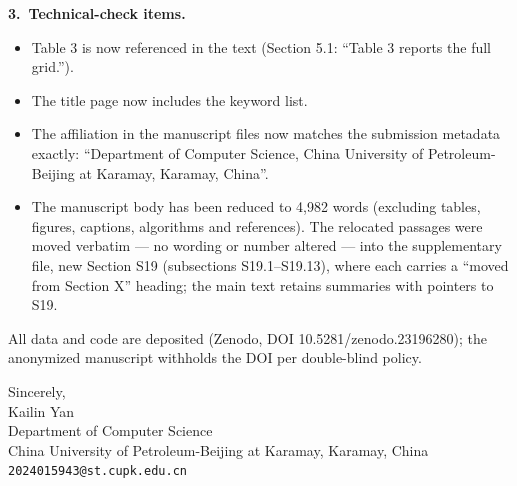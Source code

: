 \documentclass[10pt]{article}
\begin{document}
\medskip
\noindent\textbf{3.\ Technical-check items.}
\begin{itemize}
\item Table 3 is now referenced in the text (Section 5.1: ``Table 3
  reports the full grid.'').
\item The title page now includes the keyword list.
\item The affiliation in the manuscript files now matches the submission
  metadata exactly: ``Department of Computer Science, China University of
  Petroleum-Beijing at Karamay, Karamay, China''.
\item The manuscript body has been reduced to 4,982 words (excluding
  tables, figures, captions, algorithms and references). The relocated
  passages were moved verbatim --- no wording or number altered --- into
  the supplementary file, new Section S19 (subsections S19.1--S19.13),
  where each carries a ``moved from Section X'' heading; the main text
  retains summaries with pointers to S19.
\end{itemize}

\medskip
\noindent All data and code are deposited (Zenodo, DOI
10.5281/zenodo.23196280); the anonymized manuscript withholds the DOI
per double-blind policy.

\bigskip
\noindent Sincerely,\\[14pt]
\noindent Kailin Yan\\
\noindent Department of Computer Science\\
\noindent China University of Petroleum-Beijing at Karamay, Karamay, China\\
\noindent \texttt{2024015943@st.cupk.edu.cn}
\end{document}
